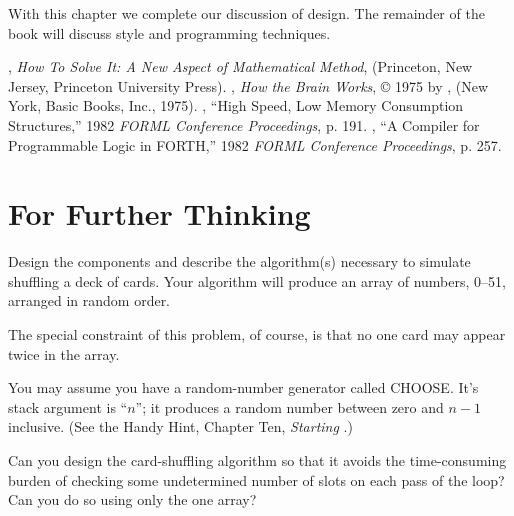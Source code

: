 With this chapter we complete our discussion of design. The remainder
of the book will discuss style and programming techniques.
%

\begin{references}{9}
 , \emph{How To Solve It: A New Aspect of
   Mathematical Method}, (Princeton, New Jersey, Princeton University
   Press).
 , \emph{How the Brain Works},
   \copyright{} 1975 by , (New York, Basic Books, Inc.,
   1975).
 , ``High Speed, Low Memory Consumption
   Structures,'' 1982 \emph{FORML Conference Proceedings}, p. 191.
 , ``A Compiler for Programmable
   Logic in FORTH,'' 1982 \emph{FORML Conference Proceedings}, p. 257.
\end{references}

\section{For Further Thinking}

Design the components and describe the algorithm(s) necessary to simulate
shuffling a deck of cards. Your algorithm will produce an array of
numbers, 0--51, arranged in random order.

The special constraint of this problem, of course, is that no one card
may appear twice in the array.

You may assume you have a random-number generator called
CHOOSE. It's stack argument is ``$n$''; it produces a random number
between zero and $n-1$ inclusive. (See the Handy Hint, Chapter Ten,
\emph{Starting \Forth{}}.)

Can you design the card-shuffling algorithm so that it avoids the
time-consuming burden of checking some undetermined number of slots
on each pass of the loop? Can you do so using only the one array?
